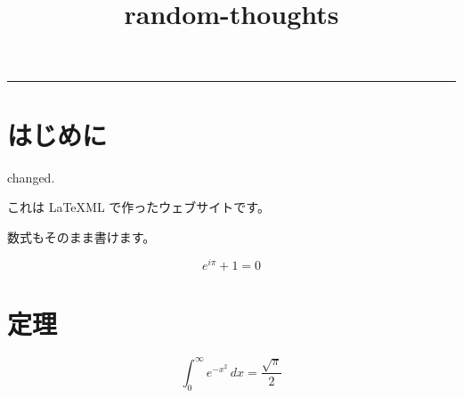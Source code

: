 \documentclass{article}
\title{random-thoughts}
\begin{document}



\noindent\rule{\textwidth}{0.4pt}

\section{はじめに}

changed.

これは LaTeXML で作ったウェブサイトです。

数式もそのまま書けます。

\[
  e^{i\pi}+1=0
\]

\section{定理}

\begin{equation}
  \int_0^\infty e^{-x^2}\,dx
  = \frac{\sqrt{\pi}}{2}
\end{equation}
\end{document}
